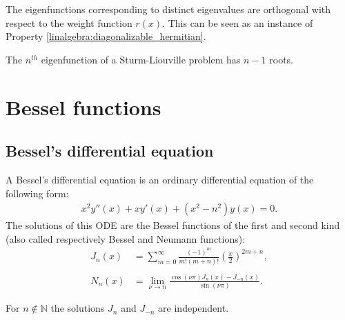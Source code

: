     \begin{property}
        The eigenfunctions corresponding to distinct eigenvalues are orthogonal with respect to the weight function $r(x)$. This can be seen as an instance of Property \ref{linalgebra:diagonalizable_hermitian}.
    \end{property}

    \begin{theorem}
        The $n^{th}$ eigenfunction of a Sturm-Liouville problem has $n-1$ roots.
    \end{theorem}

\section{Bessel functions}
\subsection{Bessel's differential equation}

    A Bessel's differential equation is an ordinary differential equation of the following form:
    \begin{gather}
        \label{ode:differential_equation}
        x^2y''(x) + xy'(x) + (x^2 - n^2)y(x) = 0.
    \end{gather}
    The solutions of this ODE are the Bessel functions of the first and second kind (also called respectively Bessel and Neumann functions):
    \begin{align}
        \label{ode:bessel_function}
        J_n(x) &= \sum_{m=0}^\infty\frac{(-1)^m}{m!(m + n)!}\left(\frac{x}{2}\right)^{2m+n},\\\nonumber\\
        \label{ode:neumann_function}
        N_n(x) &= \lim_{\nu\rightarrow n}\frac{\cos(\nu\pi)J_n(x) - J_{-n}(x)}{\sin(\nu\pi)}.
    \end{align}

    \begin{property}
        For $n\not\in\mathbb{N}$ the solutions $J_n$ and $J_{-n}$ are independent.
    \end{property}

